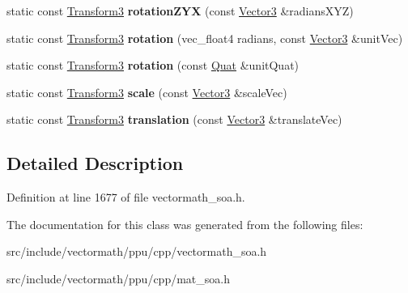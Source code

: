\begin{DoxyCompactItemize}
\item 
\hypertarget{classVectormath_1_1Soa_1_1Transform3_a1e6fed24c6f3379c5f5a398a56e44a59}{static const \hyperlink{classVectormath_1_1Soa_1_1Transform3}{Transform3} {\bfseries rotation\-Z\-Y\-X} (const \hyperlink{classVectormath_1_1Soa_1_1Vector3}{Vector3} \&radians\-X\-Y\-Z)}\label{classVectormath_1_1Soa_1_1Transform3_a1e6fed24c6f3379c5f5a398a56e44a59}

\item 
\hypertarget{classVectormath_1_1Soa_1_1Transform3_a9f8c5b23efb6da24984f72b5893d00b5}{static const \hyperlink{classVectormath_1_1Soa_1_1Transform3}{Transform3} {\bfseries rotation} (vec\-\_\-float4 radians, const \hyperlink{classVectormath_1_1Soa_1_1Vector3}{Vector3} \&unit\-Vec)}\label{classVectormath_1_1Soa_1_1Transform3_a9f8c5b23efb6da24984f72b5893d00b5}

\item 
\hypertarget{classVectormath_1_1Soa_1_1Transform3_ab4ae389151533bd295c0b55b3c8d67f0}{static const \hyperlink{classVectormath_1_1Soa_1_1Transform3}{Transform3} {\bfseries rotation} (const \hyperlink{classVectormath_1_1Soa_1_1Quat}{Quat} \&unit\-Quat)}\label{classVectormath_1_1Soa_1_1Transform3_ab4ae389151533bd295c0b55b3c8d67f0}

\item 
\hypertarget{classVectormath_1_1Soa_1_1Transform3_a5141ae4f8caa0add6ef0ecc7cde1b378}{static const \hyperlink{classVectormath_1_1Soa_1_1Transform3}{Transform3} {\bfseries scale} (const \hyperlink{classVectormath_1_1Soa_1_1Vector3}{Vector3} \&scale\-Vec)}\label{classVectormath_1_1Soa_1_1Transform3_a5141ae4f8caa0add6ef0ecc7cde1b378}

\item 
\hypertarget{classVectormath_1_1Soa_1_1Transform3_a955d6eaa884e48ca85fea54f20065de9}{static const \hyperlink{classVectormath_1_1Soa_1_1Transform3}{Transform3} {\bfseries translation} (const \hyperlink{classVectormath_1_1Soa_1_1Vector3}{Vector3} \&translate\-Vec)}\label{classVectormath_1_1Soa_1_1Transform3_a955d6eaa884e48ca85fea54f20065de9}

\end{DoxyCompactItemize}


\subsection{Detailed Description}


Definition at line 1677 of file vectormath\-\_\-soa.\-h.



The documentation for this class was generated from the following files\-:\begin{DoxyCompactItemize}
\item 
src/include/vectormath/ppu/cpp/vectormath\-\_\-soa.\-h\item 
src/include/vectormath/ppu/cpp/mat\-\_\-soa.\-h\end{DoxyCompactItemize}
